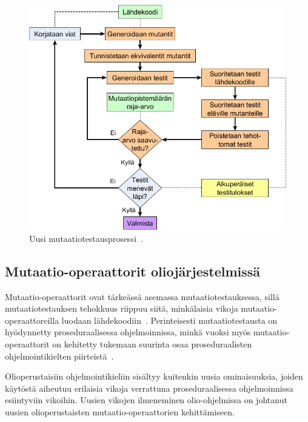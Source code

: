 \documentclass[finnish, grading]{tktltiki2}
\theoremstyle{definition}
\theoremstyle{remark}
\begin{document}
\begin{figure}[H]
	\centering
		\includegraphics[width=\textwidth]{uusiprosessi}
	\caption{Uusi mutaatiotestausprosessi~\cite[s. 41]{Offutt:Untch:2001}.}
	\label{figure:UusiMutaatiotestausprosessi}
\end{figure}


\subsection{Mutaatio-operaattorit oliojärjestelmissä}



Mutaatio-operaattorit ovat tärkeässä asemassa mutaatiotestauksessa, sillä mutaatiotestauksen tehokkuus riippuu siitä, minkälaisia vikoja mutaatio-operaattoreilla luodaan lähdekoodiin~\cite[s. 352]{Ma:Kwon:Offutt:2002}. Perinteisesti mutaatiotestausta on hyödynnetty proseduraalisessa ohjelmoinnissa, minkä vuoksi myös mutaatio-operaattorit on kehitetty tukemaan suurinta osaa proseduraalisten ohjelmointikielten piirteistä~\cite[s. 352]{Ma:Kwon:Offutt:2002}. 

Olioperustaisiin ohjelmointikieliin sisältyy kuitenkin uusia ominaisuuksia, joiden käytöstä aiheutuu erilaisia vikoja verrattuna proseduraalisessa ohjelmoinnissa esiintyviin vikoihin. Uusien vikojen ilmeneminen olio-ohjelmissa on johtanut uusien olioperustaisten mutaatio-operaattorien kehittämiseen.  
\end{document}
